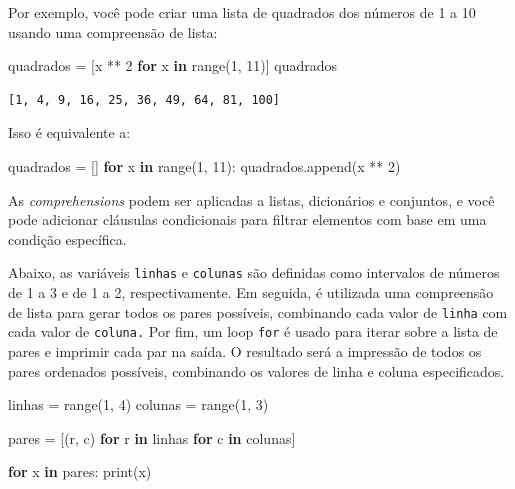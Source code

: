 \documentclass[
  portuguese,
  letterpaper,
  DIV=11,
  numbers=noendperiod]{scrreprt}
\newenvironment{Shaded}{\begin{snugshade}}{\end{snugshade}}
\newcommand{\BuiltInTok}[1]{\textcolor[rgb]{0.00,0.23,0.31}{#1}}
\newcommand{\ControlFlowTok}[1]{\textcolor[rgb]{0.00,0.23,0.31}{\textbf{#1}}}
\newcommand{\DecValTok}[1]{\textcolor[rgb]{0.68,0.00,0.00}{#1}}
\newcommand{\KeywordTok}[1]{\textcolor[rgb]{0.00,0.23,0.31}{\textbf{#1}}}
\newcommand{\NormalTok}[1]{\textcolor[rgb]{0.00,0.23,0.31}{#1}}
\newcommand{\OperatorTok}[1]{\textcolor[rgb]{0.37,0.37,0.37}{#1}}
\theoremstyle{definition}
\theoremstyle{remark}
\begin{document}
Por exemplo, você pode criar uma lista de quadrados dos números de 1 a
10 usando uma compreensão de lista:

\begin{Shaded}
\begin{Highlighting}[]
\NormalTok{quadrados }\OperatorTok{=}\NormalTok{ [x }\OperatorTok{**} \DecValTok{2} \ControlFlowTok{for}\NormalTok{ x }\KeywordTok{in} \BuiltInTok{range}\NormalTok{(}\DecValTok{1}\NormalTok{, }\DecValTok{11}\NormalTok{)]}
\NormalTok{quadrados}
\end{Highlighting}
\end{Shaded}

\begin{verbatim}
[1, 4, 9, 16, 25, 36, 49, 64, 81, 100]
\end{verbatim}

Isso é equivalente a:

\begin{Shaded}
\begin{Highlighting}[]
\NormalTok{quadrados }\OperatorTok{=}\NormalTok{ []}
\ControlFlowTok{for}\NormalTok{ x }\KeywordTok{in} \BuiltInTok{range}\NormalTok{(}\DecValTok{1}\NormalTok{, }\DecValTok{11}\NormalTok{):}
\NormalTok{    quadrados.append(x }\OperatorTok{**} \DecValTok{2}\NormalTok{)}
\end{Highlighting}
\end{Shaded}

As \emph{comprehensions} podem ser aplicadas a listas, dicionários e
conjuntos, e você pode adicionar cláusulas condicionais para filtrar
elementos com base em uma condição específica.

Abaixo, as variáveis \texttt{linhas} e \texttt{colunas} são definidas
como intervalos de números de 1 a 3 e de 1 a 2, respectivamente. Em
seguida, é utilizada uma compreensão de lista para gerar todos os pares
possíveis, combinando cada valor de \texttt{linha} com cada valor de
\texttt{coluna.} Por fim, um loop \texttt{for} é usado para iterar sobre
a lista de pares e imprimir cada par na saída. O resultado será a
impressão de todos os pares ordenados possíveis, combinando os valores
de linha e coluna especificados.

\begin{Shaded}
\begin{Highlighting}[]
\NormalTok{linhas }\OperatorTok{=} \BuiltInTok{range}\NormalTok{(}\DecValTok{1}\NormalTok{, }\DecValTok{4}\NormalTok{)}
\NormalTok{colunas }\OperatorTok{=} \BuiltInTok{range}\NormalTok{(}\DecValTok{1}\NormalTok{, }\DecValTok{3}\NormalTok{)}

\NormalTok{pares }\OperatorTok{=}\NormalTok{ [(r, c) }\ControlFlowTok{for}\NormalTok{ r }\KeywordTok{in}\NormalTok{ linhas }\ControlFlowTok{for}\NormalTok{ c }\KeywordTok{in}\NormalTok{ colunas]}

\ControlFlowTok{for}\NormalTok{ x }\KeywordTok{in}\NormalTok{ pares:}
    \BuiltInTok{print}\NormalTok{(x)}
\end{Highlighting}
\end{Shaded}
\end{document}
